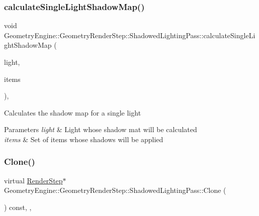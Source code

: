 \subsubsection{\texorpdfstring{calculateSingleLightShadowMap()}{calculateSingleLightShadowMap()}}
{\footnotesize\ttfamily void Geometry\+Engine\+::\+Geometry\+Render\+Step\+::\+Shadowed\+Lighting\+Pass\+::calculate\+Single\+Light\+Shadow\+Map (\begin{DoxyParamCaption}\item[{\mbox{\hyperlink{class_geometry_engine_1_1_geometry_world_item_1_1_geometry_light_1_1_light}{Geometry\+World\+Item\+::\+Geometry\+Light\+::\+Light}} $\ast$}]{light,  }\item[{std\+::unordered\+\_\+set$<$ \mbox{\hyperlink{class_geometry_engine_1_1_geometry_world_item_1_1_geometry_item_1_1_geometry_item}{Geometry\+World\+Item\+::\+Geometry\+Item\+::\+Geometry\+Item}} $\ast$ $>$ $\ast$}]{items }\end{DoxyParamCaption})\hspace{0.3cm}{\ttfamily [protected]}, {\ttfamily [virtual]}}

Calculates the shadow map for a single light 
\begin{DoxyParams}{Parameters}
{\em light} & Light whose shadow mat will be calculated \\
\hline
{\em items} & Set of items whose shadows will be applied \\
\hline
\end{DoxyParams}
\mbox{\label{class_geometry_engine_1_1_geometry_render_step_1_1_shadowed_lighting_pass_a73176d6860aee0903034eeaf93edb40d}} 
\subsubsection{\texorpdfstring{Clone()}{Clone()}}
{\footnotesize\ttfamily virtual \mbox{\hyperlink{class_geometry_engine_1_1_geometry_render_step_1_1_render_step}{Render\+Step}}$\ast$ Geometry\+Engine\+::\+Geometry\+Render\+Step\+::\+Shadowed\+Lighting\+Pass\+::\+Clone (\begin{DoxyParamCaption}{ }\end{DoxyParamCaption}) const\hspace{0.3cm}{\ttfamily [inline]}, {\ttfamily [override]}, {\ttfamily [virtual]}}

